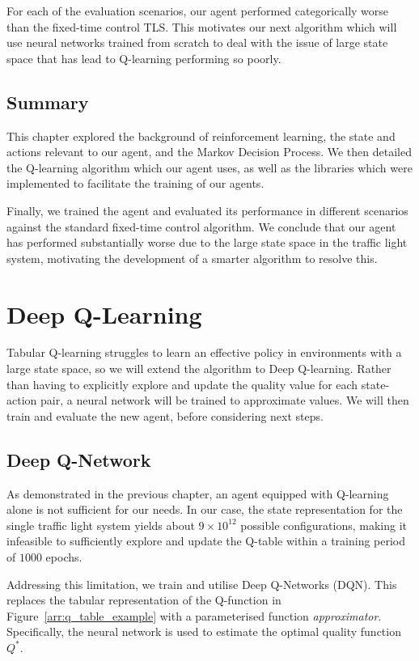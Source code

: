 \documentclass[a4paper]{report}
\begin{document}
For each of the evaluation scenarios, our agent performed categorically worse than the fixed-time control TLS. This motivates our next algorithm which will use neural networks trained from scratch to deal with the issue of large state space that has lead to Q-learning performing so poorly.

\section{Summary}

This chapter explored the background of reinforcement learning, the state and actions relevant to our agent, and the Markov Decision Process. We then detailed the Q-learning algorithm which our agent uses, as well as the libraries which were implemented to facilitate the training of our agents.

Finally, we trained the agent and evaluated its performance in different scenarios against the standard fixed-time control algorithm. We conclude that our agent has performed substantially worse due to the large state space in the traffic light system, motivating the development of a smarter algorithm to resolve this. 

\chapter{Deep Q-Learning}

Tabular Q-learning struggles to learn an effective policy in environments with a large state space, so we will extend the algorithm to Deep Q-learning. Rather than having to explicitly explore and update the quality value for each state-action pair, a neural network will be trained to approximate values. We will then train and evaluate the new agent, before considering next steps.

\section{Deep Q-Network}

As demonstrated in the previous chapter, an agent equipped with Q-learning alone is not sufficient for our needs. In our case, the state representation for the single traffic light system yields about $9\times10^{12}$ possible configurations, making it infeasible to sufficiently explore and update the Q-table within a training period of $1000$ epochs.

Addressing this limitation, we train and utilise Deep Q-Networks (DQN). This replaces the tabular representation of the Q-function in Figure~\ref{arr:q_table_example} with a parameterised function \emph{approximator}. Specifically, the neural network is used to estimate the optimal quality function $Q^*$.
\end{document}

